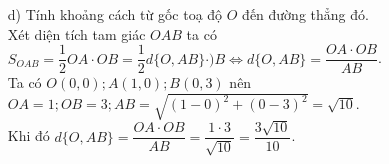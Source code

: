 \begin{bt}
{\begin{itemize}
{}
	\item[d)]  Tính khoảng cách từ gốc toạ độ $O$ đến đường thẳng đó.\\
	Xét diện tích tam giác $OAB$ ta có \\
$S_{OAB}=\dfrac{1}{2} OA\cdot OB=\dfrac{1}{2}d \{O,AB\}\cdot )B\Leftrightarrow d\{O,AB\}=\dfrac{OA\cdot OB}{AB} $.\\
Ta có $O(0,0);A(1,0);B(0,3)$ nên $OA=1;OB=3;AB=\sqrt{(1-0)^2+(0-3)^2}=\sqrt{10}$.\\
Khi đó $d\{O,AB\}=\dfrac{OA\cdot OB}{AB} =\dfrac{1\cdot 3}{\sqrt{10}}=\dfrac{3\sqrt{10}}{10}$.
\end{itemize}

}
\end{bt}


